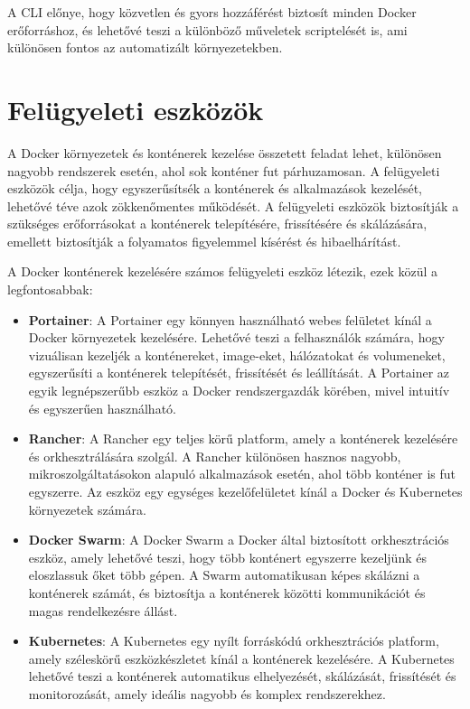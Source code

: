 A CLI előnye, hogy közvetlen és gyors hozzáférést biztosít minden Docker erőforráshoz, és lehetővé teszi a különböző műveletek scriptelését is, ami különösen fontos az automatizált környezetekben.

\section{Felügyeleti eszközök}

A Docker környezetek és konténerek kezelése összetett feladat lehet, különösen nagyobb rendszerek esetén, ahol sok konténer fut párhuzamosan. A felügyeleti eszközök célja, hogy egyszerűsítsék a konténerek és alkalmazások kezelését, lehetővé téve azok zökkenőmentes működését. A felügyeleti eszközök biztosítják a szükséges erőforrásokat a konténerek telepítésére, frissítésére és skálázására, emellett biztosítják a folyamatos figyelemmel kísérést és hibaelhárítást.

A Docker konténerek kezelésére számos felügyeleti eszköz létezik, ezek közül a legfontosabbak:

\begin{itemize}
	\item \textbf{Portainer}: A Portainer egy könnyen használható webes felületet kínál a Docker környezetek kezelésére. Lehetővé teszi a felhasználók számára, hogy vizuálisan kezeljék a konténereket, image-eket, hálózatokat és volumeneket, egyszerűsíti a konténerek telepítését, frissítését és leállítását. A Portainer az egyik legnépszerűbb eszköz a Docker rendszergazdák körében, mivel intuitív és egyszerűen használható.
	\item \textbf{Rancher}: A Rancher egy teljes körű platform, amely a konténerek kezelésére és orkhesztrálására szolgál. A Rancher különösen hasznos nagyobb, mikroszolgáltatásokon alapuló alkalmazások esetén, ahol több konténer is fut egyszerre. Az eszköz egy egységes kezelőfelületet kínál a Docker és Kubernetes környezetek számára.
	\item \textbf{Docker Swarm}: A Docker Swarm a Docker által biztosított orkhesztrációs eszköz, amely lehetővé teszi, hogy több konténert egyszerre kezeljünk és eloszlassuk őket több gépen. A Swarm automatikusan képes skálázni a konténerek számát, és biztosítja a konténerek közötti kommunikációt és magas rendelkezésre állást.
	\item \textbf{Kubernetes}: A Kubernetes egy nyílt forráskódú orkhesztrációs platform, amely széleskörű eszközkészletet kínál a konténerek kezelésére. A Kubernetes lehetővé teszi a konténerek automatikus elhelyezését, skálázását, frissítését és monitorozását, amely ideális nagyobb és komplex rendszerekhez.
\end{itemize}

